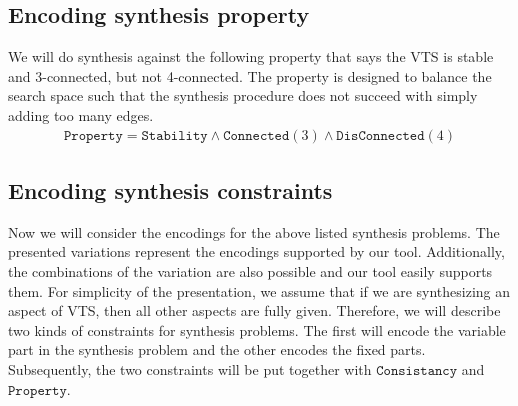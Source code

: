 \subsection{Encoding synthesis property}

We will do synthesis against the following property that says the VTS
is stable and 3-connected, but not 4-connected.
%
The property is designed to balance the search space such that the synthesis procedure does not
succeed with simply adding too many edges. 
%
\begin{align*}
  \texttt{Property} =  \texttt{Stability} \land \texttt{Connected}(3) \land \texttt{DisConnected}(4)
\end{align*}

\subsection{Encoding synthesis constraints}

Now we will consider the encodings for  the above
listed synthesis problems.
%
The presented variations represent the encodings
supported by our tool.
%
Additionally, the combinations of the variation are also possible and
our tool easily supports them.
%
For simplicity of the presentation, we assume that if we are
synthesizing an aspect of VTS, then all other aspects are fully given.
%
Therefore, we will describe two kinds of constraints for synthesis
problems.
%
The first will encode the variable part in the synthesis problem and
the other encodes the fixed parts.
%
Subsequently, the two constraints will be put together with 
$\texttt{Consistancy}$ and 
$\texttt{Property}$.

